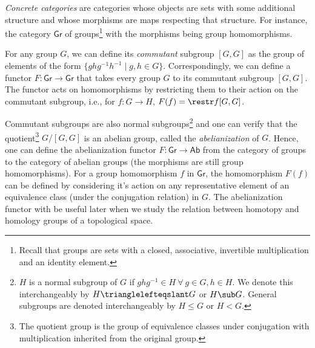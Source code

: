 \emph{Concrete categories} are categories whose objects are sets
with some additional structure and whose morphisms are maps respecting
that structure. For instance, the category $\mathsf{Gr}$ of groups\footnote{Recall that groups are sets with a closed, associative, invertible
multiplication and an identity element.} with the morphisms being group homomorphisms.
\begin{example}
    For any group $G$, we can define its \emph{commutant} subgroup
    $[G,G]$ as the group of elements of the form $\{ghg^{-1}h^{-1}\mid g,h\in G\}$.
    Correspondingly, we can define a functor $F:\mathsf{Gr}\rightarrow\mathsf{Gr}$
    that takes every group $G$ to its commutant subgroup $[G,G]$. The
    functor acts on homomorphisms by restricting them to their action
    on the commutant subgroup, i.e., for $f:G\rightarrow H$, $F(f)=\restr f{[G,G]}$.

    Commutant subgroups are also normal subgroups\footnote{$H$ is a normal subgroup of $G$ if $ghg^{-1}\in H~\forall~g\in G,h\in H$. We denote this interchangeably by $H \trianglelefteqslant G$ or $H \sub G$. General subgroups are denoted interchangeably by $H\leq G$ or $H<G$.\index{$<$}}
    and one can verify that the quotient\footnote{The quotient group is the group of equivalence classes under conjugation
    with multiplication inherited from the original group.} $G/[G,G]$ is an abelian group, called the \emph{abelianization}
    of $G$. Hence, one can define the abelianization functor
    $F:\mathsf{Gr}\rightarrow\mathsf{Ab}$ from the category of groups
    to the category of abelian groups (the morphisms are still group homomorphisms).
    For a group homomorphism $f$ in $\mathsf{Gr}$, the homomorphism
    $F(f)$ can be defined by considering it's action on any representative
    element of an equivalence class (under the conjugation relation) in
    $G$. The abelianization functor with be useful later when we study
    the relation between homotopy and homology groups of a topological
    space.
\end{example}
%
